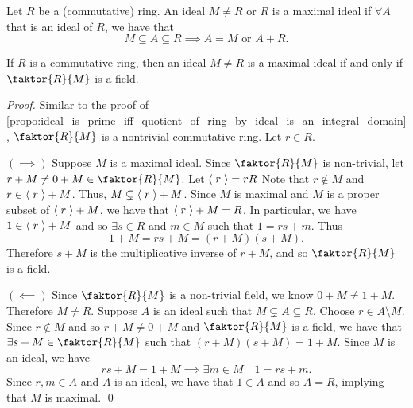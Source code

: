 \begin{defn}
\label{defn:maximal_ideals}
  Let $R$ be a (commutative) ring. An ideal $M \neq R$ or $R$ is a maximal ideal if $\forall A$ that is an ideal of $R$, we have that
  \begin{equation*}
    M \subseteq A \subseteq R \implies A = M \text{ or } A + R.
  \end{equation*}
\end{defn}

\begin{propo}
\label{propo:ideal_is_maximal_iff_quotient_of_ring_by_ideal_is_a_field}
  If $R$ is a commutative ring, then an ideal $M \neq R$ is a maximal ideal if and only if $\faktor{R}{M}$ is a field.
\end{propo}

\begin{proof}
  Similar to the proof of \cref{propo:ideal_is_prime_iff_quotient_of_ring_by_ideal_is_an_integral_domain}, $\faktor{R}{M}$ is a nontrivial commutative ring. Let $r \in R$.

  \noindent $(\implies)$ Suppose $M$ is a maximal ideal. Since $\faktor{R}{M}$ is non-trivial, let $r + M \neq 0 + M \in \faktor{R}{M}$. Let $\langle \; r \; \rangle = rR$ Note that $r \notin M$ and $r \in \langle \; r \; \rangle + M$. Thus, $M \subsetneq \langle \; r \; \rangle + M$. Since $M$ is maximal and $M$ is a proper subset of $\langle \; r \; \rangle + M$, we have that $\langle \; r \; \rangle + M = R$. In particular, we have $1 \in \langle \; r \; \rangle + M$ and so $\exists s \in R$ and $m \in M$ such that $1 = rs + m$. Thus
  \begin{equation*}
    1 + M = rs + M = (r + M)(s + M).
  \end{equation*}
  Therefore $s + M$ is the multiplicative inverse of $r + M$, and so $\faktor{R}{M}$ is a field.

  \noindent $(\impliedby)$ Since $\faktor{R}{M}$ is a non-trivial field, we know $0 + M \neq 1 + M$. Therefore $M \neq R$. Suppose $A$ is an ideal such that $M \subsetneq A \subseteq R$. Choose $r \in A \setminus M$. Since $r \notin M$ and so $r + M \neq 0 + M$ and $\faktor{R}{M}$ is a field, we have that $\exists s + M \in \faktor{R}{M}$ such that $(r + M)(s + M) = 1 + M$. Since $M$ is an ideal, we have
  \begin{equation*}
    rs + M = 1 + M \implies \exists m \in M \quad 1 = rs + m.
  \end{equation*}
  Since $r, m \in A$ and $A$ is an ideal, we have that $1 \in A$ and so $A = R$, implying that $M$ is maximal. \qed
\end{proof}

